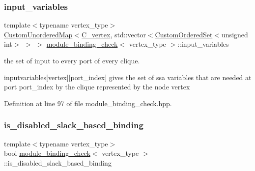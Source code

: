 \mbox{\label{structmodule__binding__check_a1921afd62271b0fd65f29257665cee5b}} 
\subsubsection{\texorpdfstring{input\+\_\+variables}{input\_variables}}
{\footnotesize\ttfamily template$<$typename vertex\+\_\+type$>$ \\
\hyperlink{custom__map_8hpp_ad1ed68f2ff093683ab1a33522b144adc}{Custom\+Unordered\+Map}$<$\hyperlink{clique__covering__graph_8hpp_a9cb45047ea8c5ed95a8cfa90494345aa}{C\+\_\+vertex}, std\+::vector$<$\hyperlink{classCustomOrderedSet}{Custom\+Ordered\+Set}$<$unsigned int$>$ $>$ $>$ \hyperlink{structmodule__binding__check}{module\+\_\+binding\+\_\+check}$<$ vertex\+\_\+type $>$\+::input\+\_\+variables\hspace{0.3cm}{\ttfamily [private]}}



the set of input to every port of every clique. 

inputvariables\mbox{[}vertex\mbox{]}\mbox{[}port\+\_\+index\mbox{]} gives the set of ssa variables that are needed at port port\+\_\+index by the clique represented by the node vertex 

Definition at line 97 of file module\+\_\+binding\+\_\+check.\+hpp.

\mbox{\label{structmodule__binding__check_a84ced41c5c2da50b99a13712f258c63e}} 
\subsubsection{\texorpdfstring{is\+\_\+disabled\+\_\+slack\+\_\+based\+\_\+binding}{is\_disabled\_slack\_based\_binding}}
{\footnotesize\ttfamily template$<$typename vertex\+\_\+type$>$ \\
bool \hyperlink{structmodule__binding__check}{module\+\_\+binding\+\_\+check}$<$ vertex\+\_\+type $>$\+::is\+\_\+disabled\+\_\+slack\+\_\+based\+\_\+binding\hspace{0.3cm}{\ttfamily [protected]}}



